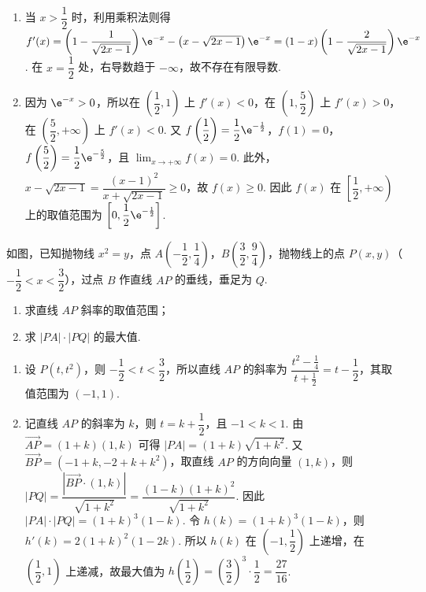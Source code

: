 \begin{solution}
\begin{enumerate}
\item 当 \(x>\dfrac{1}{2}\) 时，利用乘积法则得 \(f'(x)=\left(1-\dfrac{1}{\sqrt{2x-1}}\right)\e^{-x}-\left(x-\sqrt{2x-1}\right)\e^{-x}=\left(1-x\right)\left(1-\dfrac{2}{\sqrt{2x-1}}\right)\e^{-x}\). 在 \(x=\dfrac{1}{2}\) 处，右导数趋于 \(-\infty\)，故不存在有限导数.
\item 因为 \(\e^{-x}>0\)，所以在 \(\left(\dfrac{1}{2},1\right)\) 上 \(f'(x)<0\)，在 \(\left(1,\dfrac{5}{2}\right)\) 上 \(f'(x)>0\)，在 \(\left(\dfrac{5}{2},+\infty\right)\) 上 \(f'(x)<0\). 又 \(f\left(\dfrac{1}{2}\right)=\dfrac{1}{2}\e^{-\frac{1}{2}}\)，\(f(1)=0\)，\(f\left(\dfrac{5}{2}\right)=\dfrac{1}{2}\e^{-\frac{5}{2}}\)，且 \(\displaystyle\lim_{x\to+\infty}f(x)=0\). 此外，\(x-\sqrt{2x-1}=\dfrac{(x-1)^2}{x+\sqrt{2x-1}}\geq0\)，故 \(f(x)\geq0\). 因此 \(f(x)\) 在 \(\left[\dfrac{1}{2},+\infty\right)\) 上的取值范围为 \(\left[0,\dfrac{1}{2}\e^{-\frac{1}{2}}\right]\).
\end{enumerate}
\end{solution}

\begin{problem}
如图，已知抛物线 \(x^2=y\)，点 \(A\left(-\dfrac12,\dfrac14\right)\)，\(B\left(\dfrac32,\dfrac94\right)\)，抛物线上的点 \(P(x,y)\)（\(-\dfrac12<x<\dfrac32\)），过点 \(B\) 作直线 \(AP\) 的垂线，垂足为 \(Q\).

\begin{enumerate}
\item 求直线 \(AP\) 斜率的取值范围；
\item 求 \(|PA|\cdot|PQ|\) 的最大值.
\end{enumerate}

\begin{center}
\end{center}
\end{problem}

\begin{solution}
\begin{enumerate}
\item 设 \(P(t,t^2)\)，则 \(-\dfrac{1}{2}<t<\dfrac{3}{2}\)，所以直线 \(AP\) 的斜率为 \(\dfrac{t^2-\frac{1}{4}}{t+\frac{1}{2}}=t-\dfrac{1}{2}\)，其取值范围为 \((-1,1)\).
\item 记直线 \(AP\) 的斜率为 \(k\)，则 \(t=k+\dfrac{1}{2}\)，且 \(-1<k<1\). 由 \(\overrightarrow{AP}=(1+k)(1,k)\) 可得 \(|PA|=(1+k)\sqrt{1+k^2}\). 又 \(\overrightarrow{BP}=\left(-1+k, -2+k+k^2\right)\)，取直线 \(AP\) 的方向向量 \((1,k)\)，则 \(|PQ|=\dfrac{|\overrightarrow{BP}\cdot(1,k)|}{\sqrt{1+k^2}}=\dfrac{(1-k)(1+k)^2}{\sqrt{1+k^2}}\). 因此 \(|PA|\cdot|PQ|=(1+k)^3(1-k)\). 令 \(h(k)=(1+k)^3(1-k)\)，则 \(h'(k)=2(1+k)^2(1-2k)\). 所以 \(h(k)\) 在 \((-1,\dfrac{1}{2})\) 上递增，在 \((\dfrac{1}{2},1)\) 上递减，故最大值为 \(h\left(\dfrac{1}{2}\right)=\left(\dfrac{3}{2}\right)^3\cdot\dfrac{1}{2}=\dfrac{27}{16}\).
\end{enumerate}
\end{solution}

